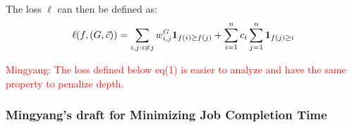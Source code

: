 The loss $\ell$ can then be defined as:
\begin{align*}
  \ell(f, (G, \vec{c}))
  = \sum_{i,j: i \neq j} w_{i,j}^G {\mathbf 1}_{f(i) \geq f(j)}
  + \sum_{i=1}^n c_i \sum_{j=1}^n {\mathbf 1}_{f(j) \geq i}
\end{align*}

\textcolor{red}{Mingyang: The loss defined below eq(1) is easier to analyze and have the same property to penalize depth.}


\subsubsection{Mingyang's draft for Minimizing Job Completion Time}

